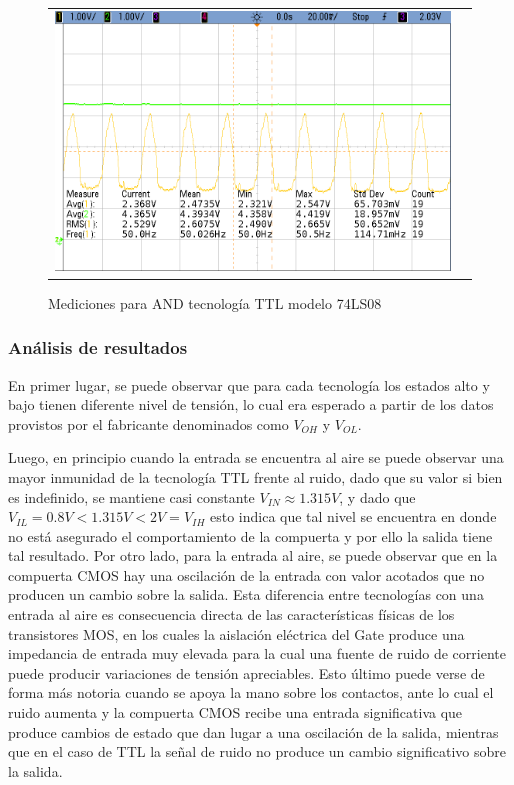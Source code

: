 \begin{figure}[H]
\begin{tabular}{c c}
            \includegraphics[scale=0.2]{../EJ5/Mediciones/Osciloscopio/TTL_AND_SOLA/cropped_entrada_ruido_frecuencia.png}  
        \end{tabular}
    \caption{Mediciones para AND tecnolog\'ia TTL modelo 74LS08}
    \label{fig:ttl_and_al_aire}
\end{figure}

\subsubsection{An\'alisis de resultados}
En primer lugar, se puede observar que para cada tecnolog\'ia los estados alto y bajo tienen diferente nivel de tensi\'on, lo cual
era esperado a partir de los datos provistos por el fabricante denominados como $V_{OH}$ y $V_{OL}$.

Luego, en principio cuando la entrada se encuentra al aire se puede observar una mayor inmunidad de la tecnolog\'ia TTL frente al ruido,
dado que su valor si bien es indefinido, se mantiene casi constante $V_{IN} \approx 1.315V$, y dado que $V_{IL} = 0.8V < 1.315V < 2V = V_{IH}$ esto indica que
tal nivel se encuentra en donde no est\'a asegurado el comportamiento de la compuerta y por ello la salida tiene tal resultado. Por otro lado, para la entrada al aire,
se puede observar que en la compuerta CMOS hay una oscilaci\'on de la entrada con valor acotados que no producen un cambio sobre la salida.
Esta diferencia entre tecnolog\'ias con una entrada al aire es consecuencia directa de las caracter\'isticas f\'isicas de los transistores MOS, en los cuales la aislaci\'on el\'ectrica
del Gate produce una impedancia de entrada muy elevada para la cual una fuente de ruido de corriente puede producir variaciones de tensi\'on apreciables. Esto \'ultimo puede verse de forma m\'as notoria
cuando se apoya la mano sobre los contactos, ante lo cual el ruido aumenta y la compuerta CMOS recibe una entrada significativa que produce cambios de estado que dan lugar a una oscilaci\'on de la salida,
mientras que en el caso de TTL la se\~nal de ruido no produce un cambio significativo sobre la salida.


